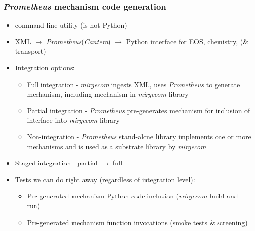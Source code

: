 \begin{frame}\frametitle{\textit{Prometheus} mechanism code generation}
\begin{multicols}{2}
\begin{itemize}
   \item {} command-line utility (is not Python)
   \item XML $\rightarrow$ \textit{Prometheus}(\textit{Cantera}) $\rightarrow$ Python interface for EOS, chemistry, (\& transport)
\end{itemize}
\begin{itemize}
   \item Integration options:
   \begin{itemize}
      \item Full integration - \textit{mirgecom} ingests XML, uses \textit{Prometheus} to generate mechanism, including mechanism in \textit{mirgecom} library
      \item Partial integration - \textit{Prometheus} pre-generates mechanism for inclusion of interface into \textit{mirgecom} library
      \item Non-integration - \textit{Prometheus} stand-alone library implements one or more mechanisms and is used as a substrate library by \textit{mirgecom} 
   \end{itemize}
    \item Staged integration - partial $\rightarrow$ full
   \item Tests we can do right away (regardless of integration level):
   \begin{itemize}
      \item Pre-generated mechanism Python code inclusion (\textit{mirgecom} build and run)
      \item Pre-generated mechanism function invocations (smoke tests \& screening)
   \end{itemize}
\end{itemize}
\end{multicols}
\end{frame}

